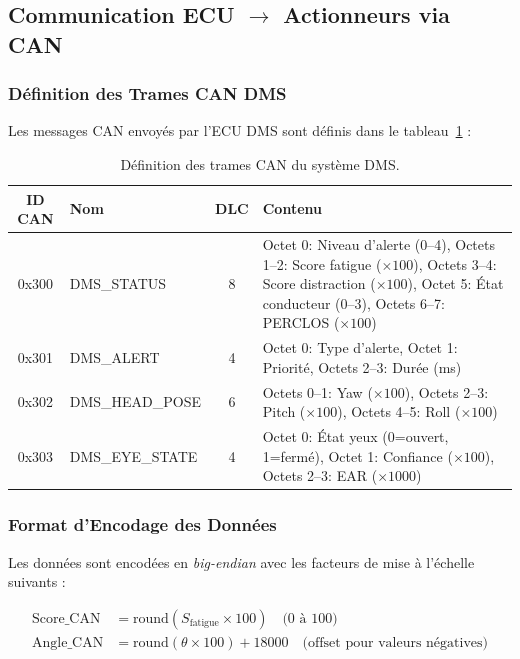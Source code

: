 \documentclass[12pt,a4paper,twoside]{report}
\begin{document}
\subsection{Communication ECU $\rightarrow$ Actionneurs via CAN}

\subsubsection{Définition des Trames CAN DMS}

Les messages CAN envoyés par l'ECU DMS sont définis dans le tableau~\ref{tab:can_messages} :

\begin{table}[H]
\centering
\caption{Définition des trames CAN du système DMS.}
\label{tab:can_messages}
\renewcommand{\arraystretch}{1.3}
\begin{tabularx}{\textwidth}{|c|l|c|X|}
\hline
\rowcolor{stellantisblue!15}
\textbf{ID CAN} & \textbf{Nom} & \textbf{DLC} & \textbf{Contenu} \\
\hline
0x300 & DMS\_STATUS & 8 & Octet 0: Niveau d'alerte (0--4), Octets 1--2: Score fatigue ($\times 100$), Octets 3--4: Score distraction ($\times 100$), Octet 5: État conducteur (0--3), Octets 6--7: PERCLOS ($\times 100$) \\
\hline
0x301 & DMS\_ALERT & 4 & Octet 0: Type d'alerte, Octet 1: Priorité, Octets 2--3: Durée (ms) \\
\hline
0x302 & DMS\_HEAD\_POSE & 6 & Octets 0--1: Yaw ($\times 100$), Octets 2--3: Pitch ($\times 100$), Octets 4--5: Roll ($\times 100$) \\
\hline
0x303 & DMS\_EYE\_STATE & 4 & Octet 0: État yeux (0=ouvert, 1=fermé), Octet 1: Confiance ($\times 100$), Octets 2--3: EAR ($\times 1000$) \\
\hline
\end{tabularx}
\end{table}

\subsubsection{Format d'Encodage des Données}

Les données sont encodées en \textit{big-endian} avec les facteurs de mise à l'échelle suivants :

\begin{align}
\text{Score\_CAN} &= \text{round}(S_{\text{fatigue}} \times 100) \quad \text{(0 à 100)} \label{eq:can_score} \\
\text{Angle\_CAN} &= \text{round}(\theta \times 100) + 18000 \quad \text{(offset pour valeurs négatives)} \label{eq:can_angle}
\end{align}
\end{document}
